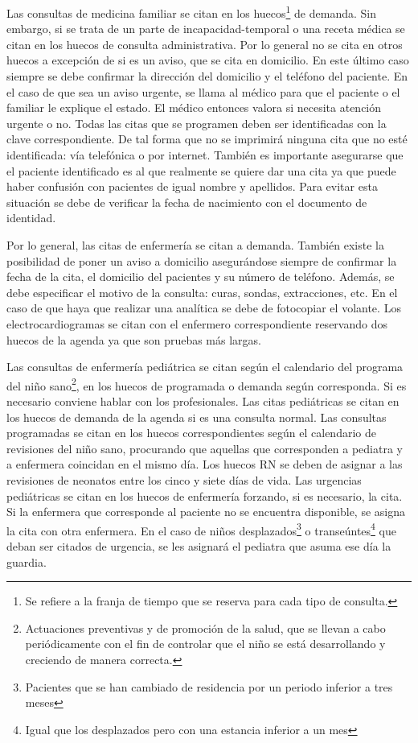 Las consultas de medicina familiar se citan en los huecos\footnote{Se refiere a la franja de tiempo que se reserva para cada tipo de consulta.} de demanda.
Sin embargo, si se trata de un parte de \gls{incapacidad-temporal} o una receta médica se citan en los huecos de consulta administrativa.
Por lo general no se cita en otros huecos a excepción de si es un aviso, que se cita en domicilio.
En este último caso siempre se debe confirmar la dirección del domicilio y el teléfono del paciente.
En el caso de que sea un aviso urgente, se llama al médico para que el paciente o el familiar le explique el estado.
El médico entonces valora si necesita atención urgente o no.
Todas las citas que se programen deben ser identificadas con la clave correspondiente.
De tal forma que no se imprimirá ninguna cita que no esté identificada: vía telefónica o por internet.
También es importante asegurarse que el paciente identificado es al que realmente se quiere dar una cita ya que puede haber confusión con pacientes de igual nombre y apellidos.
Para evitar esta situación se debe de verificar la fecha de nacimiento con el documento de identidad.

Por lo general, las citas de enfermería se citan a demanda.
También existe la posibilidad de poner un aviso a domicilio asegurándose siempre de confirmar la fecha de la cita, el domicilio del pacientes y su número de teléfono.
Además, se debe especificar el motivo de la consulta: curas, sondas, extracciones, etc.
En el caso de que haya que realizar una analítica se debe de fotocopiar el \gls{volante}.
Los \glspl{electrocardiograma} se citan con el enfermero correspondiente reservando dos huecos de la agenda ya que son pruebas más largas.

Las consultas de enfermería pediátrica se citan según el calendario del programa del niño sano\footnote{Actuaciones preventivas y de promoción de la salud, que se llevan a cabo periódicamente con el fin de controlar que el niño se está desarrollando y creciendo de manera correcta.}, en los huecos de programada o demanda según corresponda. Si es necesario conviene hablar con los profesionales.
Las citas pediátricas se citan en los huecos de demanda de la agenda si es una consulta normal.
Las consultas programadas se citan en los huecos correspondientes según el calendario de revisiones del niño sano, procurando que aquellas que corresponden a pediatra y a enfermera coincidan en el mismo día.
Los huecos RN se deben de asignar a las revisiones de neonatos entre los cinco y siete días de vida.
Las urgencias pediátricas se citan en los huecos de enfermería forzando, si es necesario, la cita.
Si la enfermera que corresponde al paciente no se encuentra disponible, se asigna la cita con otra enfermera.
En el caso de niños desplazados\footnote{Pacientes que se han cambiado de residencia por un periodo inferior a tres meses} o transeúntes\footnote{Igual que los desplazados pero con una estancia inferior a un mes} que deban ser citados de urgencia, se les asignará el pediatra que asuma ese día la \gls{guardia}.

